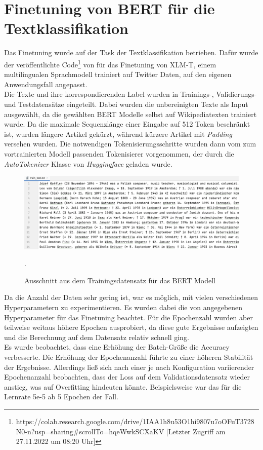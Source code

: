 \documentclass[ngerman]{ttlab-qualify}
\begin{document}
\section{Finetuning von BERT für die Textklassifikation} \label{TC_BERT}
Das Finetuning wurde auf der Task der Textklassifikation betrieben. Dafür wurde der veröffentlichte Code\footnote{https://colab.research.google.com/drive/1IAA1h8u53O1hi9807u7oOFuT3728N0-n?usp=sharing\#scrollTo=hqeWwkSCXaKV [Letzter Zugriff am 27.11.2022 um 08:20 Uhr]} von \textcite{xlm-t} für das Finetuning von XLM-T, einem multilingualen Sprachmodell trainiert auf Twitter Daten, auf den eigenen Anwendungsfall angepasst.\\Die Texte und ihre korrespondierenden Label wurden in Trainings-, Validierungs-  und Testdatensätze eingeteilt. Dabei wurden die unbereinigten Texte als Input ausgewählt, da die gewählten BERT Modelle selbst auf Wikipediatexten trainiert wurde. Da die maximale Sequenzlänge einer Eingabe auf 512 Token beschränkt ist, wurden längere Artikel gekürzt, während kürzere Artikel mit \textit{Padding} versehen wurden. Die notwendigen Tokenisierungsschritte wurden dann vom zum vortrainierten Modell passenden Tokenisierer vorgenommen, der durch die \textit{AutoTokenizer} Klasse von \textit{Huggingface} geladen wurde. 
\begin{figure}[H]
\begin{center}
\includegraphics[width=16cm]{grafiken/BERT_X_train_dataset.png}
\caption[Ausschnitt aus dem Trainingsdatensatz für das BERT Modell]{Ausschnitt aus dem Trainingsdatensatz für das BERT Modell}.
\label{BERT_X_train_dataset}
\end{center}
\end{figure} 
\noindent Da die Anzahl der Daten sehr gering ist, war es möglich, mit vielen verschiedenen Hyperparametern zu experimentieren. Es wurden dabei die von \textcite{devlin-etal-2019-bert} angegebenen Hyperparameter für das Finetuning beachtet. Für die Epochenzahl wurden aber teilweise weitaus höhere Epochen ausprobiert, da diese gute Ergebnisse aufzeigten und die Berechnung auf dem Datensatz relativ schnell ging.\\
Es wurde beobachtet, dass eine Erhöhung der Batch-Größe die Accuracy verbesserte. Die Erhöhung der Epochenanzahl führte zu einer höheren Stabilität der Ergebnisse. Allerdings ließ sich nach einer je nach Konfiguration variierender Epochenanzahl beobachten, dass der Loss auf dem Validationsdatensatz wieder anstieg, was auf Overfitting hindeuten könnte. Beispielsweise war das für die Lernrate 5e-5 ab 5 Epochen der Fall.
\end{document}

